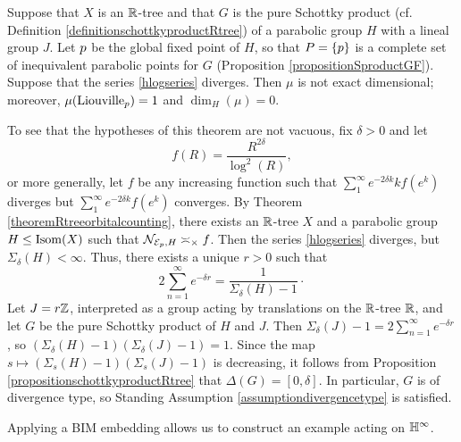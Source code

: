 \begin{theorem}
\label{theoremhlogseriesconverse}
Suppose that $X$ is an $\R$-tree and that $G$ is the pure Schottky product (cf. Definition \ref{definitionschottkyproductRtree}) of a parabolic group $H$ with a lineal group $J$. Let $p$ be the global fixed point of $H$, so that $P = \{p\}$ is a complete set of inequivalent parabolic points for $G$ (Proposition \ref{propositionSproductGF}). Suppose that the series \eqref{hlogseries} diverges. Then $\mu$ is not exact dimensional; moreover, $\mu(\mathrm{Liouville}_p) = 1$ and $\dim_H(\mu) = 0$.
\end{theorem}
\begin{example}
\label{examplenotexactdim}
To see that the hypotheses of this theorem are not vacuous, fix $\delta > 0$ and let
\[
f(R) = \frac{R^{2\delta}}{\log^2(R)},
\]
or more generally, let $f$ be any increasing function such that $\sum_1^\infty e^{-2\delta k} k f(e^k)$ diverges but $\sum_1^\infty e^{-2\delta k} f(e^k)$ converges. By Theorem \ref{theoremRtreeorbitalcounting}, there exists an $\R$-tree $X$ and a parabolic group $H\leq\operatorname{Isom}(X)$ such that $\mathcal N_{\mathcal E_p,H} \asymp_\times f$. Then the series \eqref{hlogseries} diverges, but $\Sigma_\delta(H) < \infty$. Thus, there exists a unique $r > 0$ such that
\[
2\sum_{n = 1}^\infty e^{-\delta r} = \frac{1}{\Sigma_\delta(H) - 1}\cdot
\]
Let $J = r\Z$, interpreted as a group acting by translations on the $\R$-tree $\R$, and let $G$ be the pure Schottky product of $H$ and $J$. Then $\Sigma_\delta(J) - 1 = 2\sum_{n = 1}^\infty e^{-\delta r}$, so $(\Sigma_\delta(H) - 1)(\Sigma_\delta(J) - 1) = 1$. Since the map $s\mapsto (\Sigma_s(H) - 1)(\Sigma_s(J) - 1)$ is decreasing, it follows from Proposition \ref{propositionschottkyproductRtree} that $\Delta(G) = [0,\delta]$. In particular, $G$ is of divergence type, so Standing Assumption \ref{assumptiondivergencetype} is satisfied.
\end{example}
\begin{remark}
Applying a BIM embedding allows us to construct an example acting on $\H^\infty$.
\end{remark}
